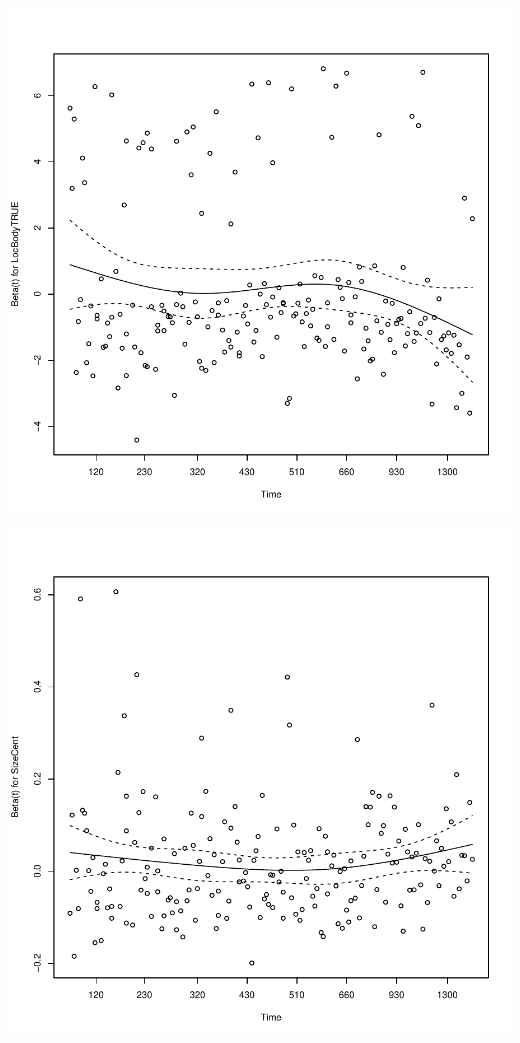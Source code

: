 \documentclass{article}\usepackage[]{graphicx}\usepackage[]{color}
\makeatletter
\def\maxwidth{ %
  \ifdim\Gin@nat@width>\linewidth
    \linewidth
  \else
    \Gin@nat@width
  \fi
}
\newenvironment{knitrout}{}{} %
\makeatother
\begin{document}
\begin{knitrout}
{}




{\centering \includegraphics[width=\maxwidth]{figure/eda-ph-check-full-4} 

}




{\centering \includegraphics[width=\maxwidth]{figure/eda-ph-check-full-5} 

}
\end{knitrout}
\end{document}
